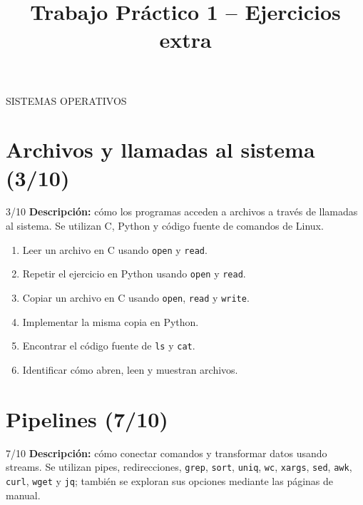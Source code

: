 \documentclass[11pt,a4paper]{article}
\title{Trabajo Práctico 1 -- Ejercicios extra}
\author{}
\date{}
\begin{document}
\renewcommand{\contentsname}{Tracks}
\maketitle
\thispagestyle{fancy}
\begin{center}
SISTEMAS OPERATIVOS
\end{center}
\newpage

\tableofcontents
\newpage

\section{Archivos y llamadas al sistema (3/10)}

\begin{trackbox}{3/10}
\textbf{Descripción:} cómo los programas acceden a archivos a través de llamadas al sistema. Se utilizan C, Python y código fuente de comandos de Linux.
\end{trackbox}

\begin{enumerate}
  \item Leer un archivo en C usando \texttt{open} y \texttt{read}.
  \item Repetir el ejercicio en Python usando \texttt{open} y \texttt{read}.
  \item Copiar un archivo en C usando \texttt{open}, \texttt{read} y \texttt{write}.
  \item Implementar la misma copia en Python.
  \item Encontrar el código fuente de \texttt{ls} y \texttt{cat}.
  \item Identificar cómo abren, leen y muestran archivos.
\end{enumerate}

\newpage
\section{Pipelines (7/10)}

\begin{trackbox}{7/10}
\textbf{Descripción:} cómo conectar comandos y transformar datos usando streams. Se utilizan pipes, redirecciones, \texttt{grep}, \texttt{sort}, \texttt{uniq}, \texttt{wc}, \texttt{xargs}, \texttt{sed}, \texttt{awk}, \texttt{curl}, \texttt{wget} y \texttt{jq}; también se exploran sus opciones mediante las páginas de manual.
\end{trackbox}
\end{document}
